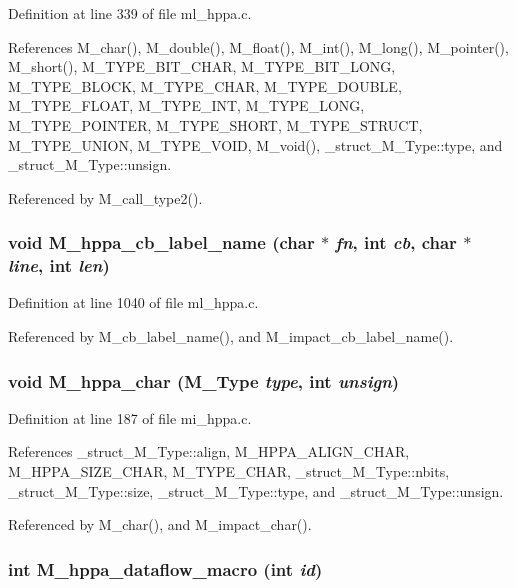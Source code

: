 Definition at line 339 of file ml\_\-hppa.c.

References M\_\-char(), M\_\-double(), M\_\-float(), M\_\-int(), M\_\-long(), M\_\-pointer(), M\_\-short(), M\_\-TYPE\_\-BIT\_\-CHAR, M\_\-TYPE\_\-BIT\_\-LONG, M\_\-TYPE\_\-BLOCK, M\_\-TYPE\_\-CHAR, M\_\-TYPE\_\-DOUBLE, M\_\-TYPE\_\-FLOAT, M\_\-TYPE\_\-INT, M\_\-TYPE\_\-LONG, M\_\-TYPE\_\-POINTER, M\_\-TYPE\_\-SHORT, M\_\-TYPE\_\-STRUCT, M\_\-TYPE\_\-UNION, M\_\-TYPE\_\-VOID, M\_\-void(), \_\-struct\_\-M\_\-Type::type, and \_\-struct\_\-M\_\-Type::unsign.

Referenced by M\_\-call\_\-type2().
\subsubsection{\setlength{\rightskip}{0pt plus 5cm}void M\_\-hppa\_\-cb\_\-label\_\-name (char $\ast$ {\em fn}, int {\em cb}, char $\ast$ {\em line}, int {\em len})}\label{m__hppa_8h_ef9ecb67aecbb17a603e49fe02ec7526}




Definition at line 1040 of file ml\_\-hppa.c.

Referenced by M\_\-cb\_\-label\_\-name(), and M\_\-impact\_\-cb\_\-label\_\-name().
\subsubsection{\setlength{\rightskip}{0pt plus 5cm}void M\_\-hppa\_\-char (\bf{M\_\-Type} {\em type}, int {\em unsign})}\label{m__hppa_8h_149b79ce3c8138691314a008f11b0e01}




Definition at line 187 of file mi\_\-hppa.c.

References \_\-struct\_\-M\_\-Type::align, M\_\-HPPA\_\-ALIGN\_\-CHAR, M\_\-HPPA\_\-SIZE\_\-CHAR, M\_\-TYPE\_\-CHAR, \_\-struct\_\-M\_\-Type::nbits, \_\-struct\_\-M\_\-Type::size, \_\-struct\_\-M\_\-Type::type, and \_\-struct\_\-M\_\-Type::unsign.

Referenced by M\_\-char(), and M\_\-impact\_\-char().
\subsubsection{\setlength{\rightskip}{0pt plus 5cm}int M\_\-hppa\_\-dataflow\_\-macro (int {\em id})}\label{m__hppa_8h_0aa4627b19c9098354b28bcee7e191c7}




